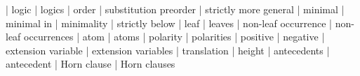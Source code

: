 
 | logic
 | logics
 | order
 | substitution preorder
 | strictly more general
 | minimal
 | minimal in
 | minimality
 | strictly below
 | leaf
 | leaves
 | non-leaf occurrence
 | non-leaf occurrences
 | atom
 | atoms
 | polarity
 | polarities
 | positive
 | negative
 | extension variable
 | extension variables
 | translation
 | height
 | antecedents
 | antecedent
 | Horn clause
 | Horn clauses
